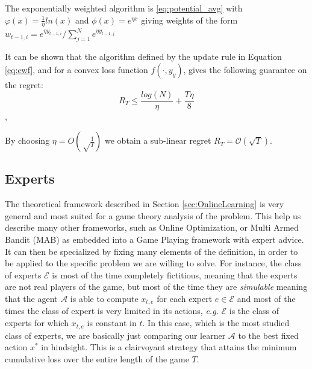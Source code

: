 \begin{definition}\label{eq:ewf}
	The exponentially weighted algorithm is \eqref{eq:potential_avg} with $\varphi(x)=\frac{1}{\eta}ln(x)$ and $\phi(x)=e^{\eta x}$ giving weights of the form $w_{t-1,i}=e^{\eta y_{t-1,i}}/\sum\limits_{j=1}^Ne^{\eta y_{t-1,j}}$
\end{definition}

It can be shown  that the algorithm defined by the update rule in Equation \eqref{eq:ewf}, and for a convex loss function $f(\cdot,y_y)$, gives the following guarantee on the regret:
\begin{equation}\label{eq:regret_ewf}
R_T\le \frac{log(N)}{\eta}+\frac{T\eta}{8}\end{equation},

By choosing $\eta=O\left(\sqrt\frac{1}{T}\right)$ we obtain a sub-linear regret $R_T=\mathcal O(\sqrt T)$. %



\subsection{Experts}
The theoretical framework described in Section \ref{sec:OnlineLearning} is very general and most suited for a game theory analysis of the problem. This help us describe many other frameworks, such as Online Optimization, or Multi Armed Bandit (MAB) as embedded into a Game Playing framework with expert advice. It can then be specialized by fixing many elements of the definition, in order to be applied to the specific problem we are willing to solve.
For instance, the class of experts $\mathcal E$ is most of the time completely fictitious, meaning that the experts are not real players of the game, but most of the time they are \emph{simulable} meaning that the agent $\mathcal A$ is able to compute $x_{t,e}$ for each expert $e\in\mathcal E$ and most of the times the class of expert is very limited in its actions, \emph{e.g.} $\mathcal E$ is the class of experts for which $x_{t,e}$ is constant in $t$. In this case, which is the most studied class of experts, we are basically just comparing our learner $\mathcal A$ to the best fixed action $x^*$ in hindsight. This is a clairvoyant strategy that attains the minimum cumulative loss over the entire length of the game $T$.

